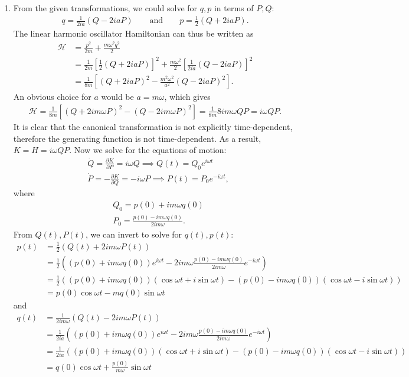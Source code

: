\documentclass{article}
\theoremstyle{definition}
\newcommand{\p}{\partial}
\newcommand{\ham}{\mathcal{H}}
\newcommand{\f}[2]{\frac{#1}{#2}}
\newcommand{\lp}{\left(}
\newcommand{\rp}{\right)}
\newcommand{\lb}{\left[}
\newcommand{\rb}{\right]}
\begin{document}
\begin{enumerate}[label=(\alph*)]
	\item From the given transformations, we could solve for $q,p$ in terms of $P,Q$:
	\begin{align*}
	q = \f{1}{2ia}(Q- 2ia P)\quad\quad\text{and}\quad\quad p= \f{1}{2}(Q + 2ia P).
	\end{align*}
	The linear harmonic oscillator Hamiltonian can thus be written as 
	\begin{align*}
	\ham &= \f{p^2}{2m} + \f{m\omega^2q^2}{2}\\ 
	&= \f{1}{2m}\lb \f{1}{2}(Q + 2ia P)  \rb^2 + \f{m\omega^2}{2}\lb \f{1}{2ia}(Q- 2ia P) \rb^2\\
	&=  \f{1}{8m}\lb (Q + 2iaP)^2 - \f{m^2\omega^2}{a^2}( Q - 2iaP)^2 \rb.
	\end{align*}
	An obvious choice for $a$ would be $\boxed{a = m\omega}$, which gives
	\begin{align*}
	\ham = \f{1}{8m} \lb (Q + 2im\omega P)^2 - ( Q - 2i m\omega P)^2 \rb = \f{1}{8m}8im\omega QP = i\omega QP.  
	\end{align*} 
	It is clear that the canonical transformation is not explicitly time-dependent, therefore the generating function is not time-dependent. As a result, $\boxed{K = H = i\omega QP}$. Now we solve for the equations of motion: 
	\begin{align*}
	&\dot Q = \f{\p K }{\p P} = i\omega Q \implies Q(t) = Q_0 e^{i\omega t}\\
	&\dot P = -\f{\p K}{\p Q} = -i\omega P \implies P(t) = P_0 e^{-i\omega t},
	\end{align*}
	where
	\begin{align*}
	&Q_0 = p(0) + im \omega q(0) \\
	&P_0 = \f{p(0) - im\omega q(0)}{2im\omega}.
	\end{align*}
	From $Q(t), P(t)$, we can invert to solve for $q(t),p(t)$:
	\begin{align*}
	\boxed{p(t)} &= \f{1}{2}\lp Q(t) + 2im\omega P(t) \rp\\ 
	&= \f{1}{2}\lp (p(0) + im \omega q(0)) e^{i\omega t} - 2im\omega \f{p(0) - im\omega q(0)}{2im\omega} e^{-i\omega t}    \rp\\
	&= \f{1}{2}\lp (p(0) + im \omega q(0))(\cos \omega t + i\sin\omega t) -  (p(0) - im\omega q(0)) (\cos\omega t - i\sin\omega t )   \rp\\
	&= \boxed{p(0)\cos\omega t - mq(0)\sin\omega t}
	\end{align*}
	and
	\begin{align*}
	\boxed{q(t)} &= \f{1}{2im\omega}(Q(t) - 2im\omega P(t)) \\
	&= \f{1}{2ia}((p(0) + im \omega q(0))e^{i\omega t}- 2im\omega \f{p(0) - im\omega q(0)}{2im\omega }e^{-i\omega t})\\
	&= \f{1}{2ia}\lp(p(0) + im \omega q(0))(\cos \omega t + i\sin\omega t) - (p(0) - im\omega q(0))(\cos \omega t - i\sin\omega t) \rp\\
	&= \boxed{q(0)\cos\omega t + \f{p(0)}{m\omega} \sin\omega t}
	\end{align*}

\end{enumerate}
\end{document}
